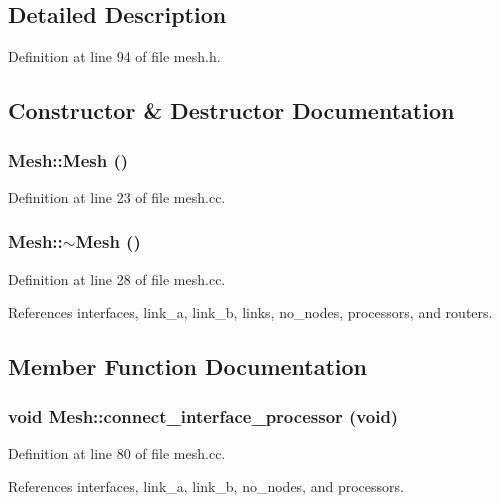 \subsection{Detailed Description}


Definition at line 94 of file mesh.h.

\subsection{Constructor \& Destructor Documentation}
\subsubsection[{Mesh}]{\setlength{\rightskip}{0pt plus 5cm}Mesh::Mesh ()}\label{classMesh_2af137f1571af89172b9c102302c416b}




Definition at line 23 of file mesh.cc.
\subsubsection[{$\sim$Mesh}]{\setlength{\rightskip}{0pt plus 5cm}Mesh::$\sim$Mesh ()}\label{classMesh_5efe4da1a4c0971cfb037bd70304c303}




Definition at line 28 of file mesh.cc.

References interfaces, link\_\-a, link\_\-b, links, no\_\-nodes, processors, and routers.

\subsection{Member Function Documentation}
\subsubsection[{connect\_\-interface\_\-processor}]{\setlength{\rightskip}{0pt plus 5cm}void Mesh::connect\_\-interface\_\-processor (void)}\label{classMesh_9dfad9769d936905f5d8b0e4ffad6743}




Definition at line 80 of file mesh.cc.

References interfaces, link\_\-a, link\_\-b, no\_\-nodes, and processors.


